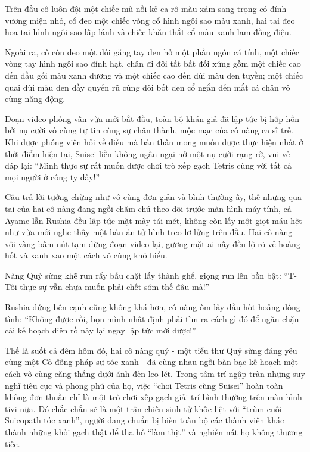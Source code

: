 \documentclass[../main.tex]{subfiles}
\begin{document}
Trên đầu cô luôn đội một chiếc mũ nồi kẻ ca-rô màu xám sang trọng có đính vương miện nhỏ, cổ đeo một chiếc vòng cổ hình ngôi sao màu xanh, hai tai đeo hoa tai hình ngôi sao lấp lánh và chiếc khăn thắt cổ màu xanh lam đồng điệu.

Ngoài ra, cô còn đeo một đôi găng tay đen hở một phần ngón cá tính, một chiếc vòng tay hình ngôi sao đính hạt, chân đi đôi tất bất đối xứng gồm một chiếc cao đến đầu gối màu xanh dương và một chiếc cao đến đùi màu đen tuyền; một chiếc quai đùi màu đen đầy quyến rũ cùng đôi bốt đen cổ ngắn đến mắt cá chân vô cùng năng động.

\chrint

Đoạn video phỏng vấn vừa mới bắt đầu, toàn bộ khán giả đã lập tức bị hớp hồn bởi nụ cười vô cùng tự tin cùng sự chân thành, mộc mạc của cô nàng ca sĩ trẻ. Khi được phóng viên hỏi về điều mà bản thân mong muốn được thực hiện nhất ở thời điểm hiện tại, Suisei liền không ngần ngại nở một nụ cười rạng rỡ, vui vẻ đáp lại: ``Mình thực sự rất muốn được chơi trò xếp gạch Tetris cùng với tất cả mọi người ở công ty đấy!''

Câu trả lời tưởng chừng như vô cùng đơn giản và bình thường ấy, thế nhưng qua tai của hai cô nàng đang ngồi chăm chú theo dõi trước màn hình máy tính, cả Ayame lẫn Rushia đều lập tức mặt mày tái mét, không còn lấy một giọt máu hệt như vừa mới nghe thấy một bản án tử hình treo lơ lửng trên đầu. Hai cô nàng vội vàng bấm nút tạm dừng đoạn video lại, gương mặt ai nấy đều lộ rõ vẻ hoảng hốt và xanh xao một cách vô cùng khó hiểu.

Nàng Quỷ sừng khẽ run rẩy bấu chặt lấy thành ghế, giọng run lên bần bật: ``T-Tôi thực sự vẫn chưa muốn phải chết sớm thế đâu mà!''

Rushia đứng bên cạnh cũng không khá hơn, cô nàng ôm lấy đầu hốt hoảng đồng tình: ``Không được rồi, bọn mình nhất định phải tìm ra cách gì đó để ngăn chặn cái kế hoạch điên rồ này lại ngay lập tức mới được!''


Thế là suốt cả đêm hôm đó, hai cô nàng quỷ - một tiểu thư Quỷ sừng đáng yêu cùng một Cô đồng pháp sư tóc xanh - đã cùng nhau ngồi bàn bạc kế hoạch một cách vô cùng căng thẳng dưới ánh đèn leo lét. Trong tâm trí ngập tràn những suy nghĩ tiêu cực và phong phú của họ, việc ``chơi Tetris cùng Suisei'' hoàn toàn không đơn thuần chỉ là một trò chơi xếp gạch giải trí bình thường trên màn hình tivi nữa. Đó chắc chắn sẽ là một trận chiến sinh tử khốc liệt với ``trùm cuối Suicopath tóc xanh'', người đang chuẩn bị biến toàn bộ các thành viên khác thành những khối gạch thật để tha hồ ``làm thịt'' và nghiền nát họ không thương tiếc.
\end{document}
